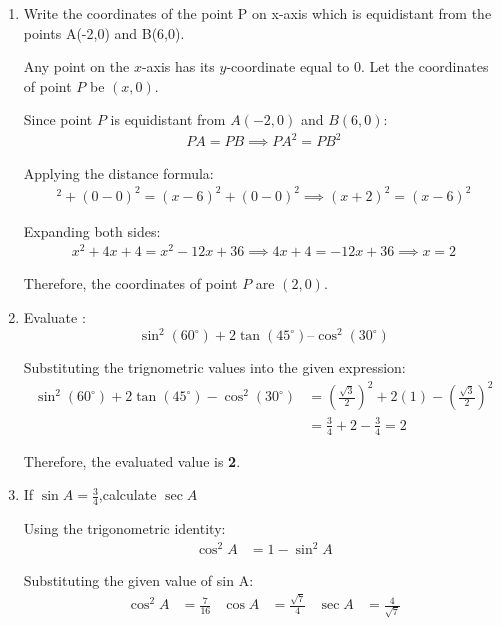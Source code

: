 
\begin{enumerate}[label=\thesubsection.\arabic*, ref=\thesubsection.\theenumi]
	
	
	\item Write the coordinates of the point P on x-axis which is equidistant from the points A(-2,0) and B(6,0).
	
	\solution
	Any point on the $x$-axis has its $y$-coordinate equal to $0$. Let the coordinates of point $P$ be $(x, 0)$.
	
	
	 Since point $P$ is equidistant from $A(-2, 0)$ and $B(6, 0)$:
	\begin{align}
	PA = PB \implies PA^2 = PB^2
    \end{align}
	
	Applying the distance formula:
	\begin{align}
	[x - (-2)]^2 + (0 - 0)^2 = (x - 6)^2 + (0 - 0)^2
	\implies (x + 2)^2 = (x - 6)^2  
	\end{align}
	
	Expanding both sides:
	\begin{align}
	x^2 + 4x + 4 = x^2 - 12x + 36 \implies
	4x + 4 = -12x + 36 \implies
	x = 2
	\end{align}
	
    Therefore, the coordinates of point $P$ are \textbf{$(2, 0)$}.
	
	\item Evaluate :
	\[
	\sin^2(60^\circ) + 2\tan(45^\circ) – \cos^2(30^\circ)
	\]
	
	\solution
	Substituting the trignometric values into the given expression:
	\begin{align*}
		\sin^2(60^\circ) + 2\tan(45^\circ) - \cos^2(30^\circ) &= \left(\frac{\sqrt{3}}{2}\right)^2 + 2(1) - \left(\frac{\sqrt{3}}{2}\right)^2 \\
		&= \frac{3}{4} + 2 - \frac{3}{4} = 2
	\end{align*}
	
	Therefore, the evaluated value is \textbf{2}.
	

	\item  If $\sin A = \frac{3}{4}$,calculate $\sec A$
	
	\solution	
	Using the trigonometric identity:
	\begin{align*}
		\cos^2 A &= 1 - \sin^2 A
	\end{align*}
	
	Substituting the given value of sin A:
\begin{align*}
	\cos^2 A &= \frac{7}{16} &\cos A&=\frac{\sqrt{7}}{4} &\sec A &= \frac{4}{\sqrt{7}}
\end{align*}
 

\end{enumerate}
